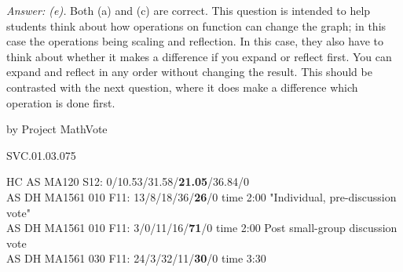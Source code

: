 {\it Answer: (e).}  Both (a) and (c) are correct.  This question is intended to help students think about how operations on function can change the graph; in this case the operations being scaling and reflection.  In this case, they also have to think about whether it makes a difference if you expand or reflect first.  You can expand and reflect in any order without changing the result.  This should be contrasted with the next question, where it does make a difference which operation is done first.

\medskip
by Project MathVote

SVC.01.03.075

HC AS MA120 S12: 0/10.53/31.58/{\bf21.05}/36.84/0  \\
AS DH MA1561 010 F11: 13/8/18/36/{\bf26}/0 time 2:00 "Individual, pre-discussion vote" \\
AS DH MA1561 010 F11: 3/0/11/16/{\bf71}/0 time 2:00 Post small-group discussion vote \\
AS DH MA1561 030 F11: 24/3/32/11/{\bf30}/0 time 3:30  \\
